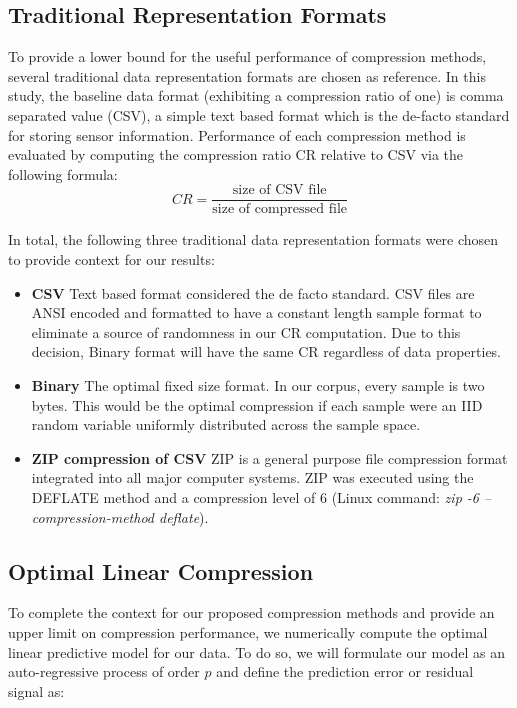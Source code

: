 \documentclass[journal]{IEEEtran}
\begin{document}
\subsection{Traditional Representation Formats}
To provide a lower bound for the useful performance of compression methods, several traditional data representation formats are chosen as reference. In this study, the baseline data format (exhibiting a compression ratio of one) is comma separated value (CSV), a simple text based format which is the de-facto standard for storing sensor information. Performance of each compression method is evaluated by computing the compression ratio CR relative to CSV via the following formula:
$$CR = \frac{\textrm{size of CSV file}}{\textrm{size of compressed file}}$$

In total, the following three traditional data representation formats were chosen to provide context for our results:

\begin{itemize}
  \item \textbf{CSV} Text based format considered the de facto standard. CSV files are ANSI encoded and formatted to have a constant length sample format to eliminate a source of randomness in our CR computation. Due to this decision, Binary format will have the same CR regardless of data properties. 
  \item \textbf{Binary} The optimal fixed size format. In our corpus, every sample is two bytes. This would be the optimal compression if each sample were an IID random variable uniformly distributed across the sample space.
  \item \textbf{ZIP compression of CSV} ZIP is a general purpose file compression format integrated into all major computer systems. ZIP was executed using the DEFLATE method \cite{Deutsch1996} and a compression level of 6 (Linux command: \textit{zip -6 --compression-method deflate}).
\end{itemize}

\subsection{Optimal Linear Compression}

To complete the context for our proposed compression methods and provide an upper limit on compression performance, we numerically compute the optimal linear predictive model for our data. To do so, we will formulate our model as an auto-regressive process of order $p$ and define the prediction error or residual signal as:
\end{document}
